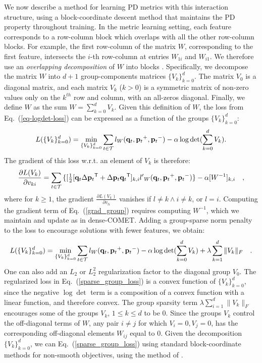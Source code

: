 \documentclass[twoside,11pt]{article}
\newcommand\mat[1]{{#1}}
\renewcommand\vec[1]{\mathbf{#1}}
\newcommand{\T}{{}^\mathsf{T}}
\newcommand{\W}{\mat{W}}
\newcommand{\q}{{\vec{q}}}
\newcommand{\p}{{\vec{p}}}
\newcommand{\trip}{{t}}
\newcommand{\qt}{{\q_{\trip}}}
\newcommand{\pt}{{\p_{\trip}}}
\newcommand{\triplet}{(\qt, \pt^{+}, \pt^{-})}
\newcommand{\Vk}{\mat{V_k}}
\newcommand{\Vg}{\{\Vk\}_{k=0}^{d}} %
\renewcommand{\eqref}[1]{Eq.~(\ref{#1})}
\begin{document}
We now describe a method for learning PD metrics with this interaction structure, using a block-coordinate descent method that maintains the PD property throughout training.
In the metric learning setting, each feature corresponds to a row-column block which overlaps with all the other row-column blocks. For example, the first row-column of the matrix $\W$, corresponding to the first feature, intersects the $i$-th row-column at entries $W_{1i}$ and $W_{i1}$. We therefore use an \emph{overlapping decomposition} of $W$ into blocks \citep{jacob2009group,obozinski2011group}. Specifically,  
we decompose the matrix $\W$ into $d+1$ group-components matrices $\Vg$. The matrix $V_0$ is a diagonal matrix, and each matrix $V_k$ ($k>0$) is a symmetric matrix of non-zero values only on the $k^{th}$ row and column, with an all-zeros diagonal. Finally, we define $\W$ as the sum $\W = \sum_{k=0}^{d}{\Vk}$.
Given this definition of $\W$, the loss from \eqref{eq-logdet-loss} can be expressed as a function of the groups $\Vg$:
\begin{equation}
L(\Vg) = 
  \min_{\Vg} \sum_{\trip \in \cal{T}}   l_{\W}(\qt, \pt^+, \pt^-) - \alpha \log \det(\sum_{k=0}^{d}{\Vk}).
  \label{group_loss}
\end{equation} 
The gradient of this loss w.r.t. an element of $\mat{V}_k$ is therefore:
\begin{equation}
  \frac{\partial {L (V_k)}}{\partial v_{ki}} = \sum\limits_{t\in \cal{T}}{\{
  [\tfrac{1}{2}[\q_{t}\Delta\p_{t}\T + \Delta\p_{t}\q_{t}\T]_{k,i}  }
  {l'}_W\triplet\} - \alpha [\W^{-1}]_{k,i} \quad,
  \label{grad_group}
\end{equation}
where for $k \geq 1$, the gradient $\frac{\partial {L (V_k)}}{\partial v_{li}}$ vanishes if  $l \neq k \wedge i \neq k$, or $l=i$. Computing the gradient term of \eqref{grad_group} requires computing $\W^{-1}$, which we maintain and update as in dense-COMET.
Adding a group-sparse norm penalty to the loss to encourage solutions with fewer features, we obtain:
\begin{equation}
L(\Vg) = 
  \min_{\Vg} \sum_{\trip \in \cal{T}}   l_{\W}(\qt, \pt^+, \pt^-) - \alpha \log \det(\sum_{k=0}^{d}{\Vk}) + \lambda \sum_{k=1}^d \|V_k\|_F \quad.
  \label{sparse_group_loss}
\end{equation} 
One can also add an $L_2$ or $L_2^2$ regularization factor to the diagonal group $V_0$. The regularized loss in \eqref{sparse_group_loss} is a convex function of $\Vg$, since the negative $\log \det$ term is a composition of a convex function with a linear function, and therefore convex.
The group sparsity term $\lambda \sum_{i=1}^d \|V_k\|_F$ encourages some of the groups $V_k$, $1\leq k \leq d$ to be $0$. Since the groups $V_k$ control the off-diagonal terms of $W$, any pair $i\neq j$ for which  $V_i=0, V_j=0$, has the corresponding off-diagonal elements $W_{ij}$ equal to $0$. Given the decomposition $\Vg$, we can \eqref{sparse_group_loss} using standard block-coordinate methods for non-smooth objectives, using the method of \citet{richtarik2014iteration}. 
\end{document}
